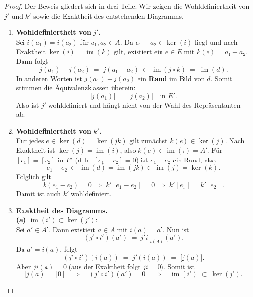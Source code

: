 \documentclass[12pt]{article}
\numberwithin{conj}{section}
\newcommand{\ima}{\operatorname{im}}
\begin{document}
    \begin{proof}
        Der Beweis gliedert sich in drei Teile. Wir zeigen die Wohldefiniertheit von
        $j'$ und $k'$ sowie die Exaktheit des entstehenden Diagramms.

        \begin{enumerate}[nolistsep]
            \item \textbf{Wohldefiniertheit von $j'$.} \\ Sei $i(a_{1}) = i(a_{2})$
                für $a_{1}, a_{2} \in A$. Da $a_{1} - a_{2} \in \ker(i)$ liegt und nach Exaktheit
                $\ker(i) = \ima(k)$ gilt, existiert ein $e \in E$ mit
                $k(e) = a_{1} - a_{2}$. Dann folgt
                \[
                    j(a_{1}) - j(a_{2}) \;=\; j(a_{1} - a_{2}) \;\in\; \ima(j \circ k) \;=\; \ima
                    (d).
                \]
                In anderen Worten ist $j(a_{1}) - j(a_{2})$ ein \textbf{Rand} im Bild
                von $d$. Somit stimmen die Äquivalenzklassen überein:
                \[
                    \bigl[j(a_{1})\bigr] \;=\; \bigl[j(a_{2})\bigr] \quad\text{in }E'.
                \]
                Also ist $j'$ wohldefiniert und hängt nicht von der Wahl des
                Repräsentanten ab.

            \item \textbf{Wohldefiniertheit von $k'$.} \\ Für jedes
                $e \in \ker(d) = \ker(jk)$ gilt zunächst $k(e) \in \ker(j)$. Nach Exaktheit
                ist $\ker(j) = \ima(i)$, also $k(e) \in \ima(i) = A'$. Für $[e_{1}] = [e_{2}
                ]$ in $E'$ (d.\,h.\ $[e_{1} - e_{2}] = 0$) ist $e_{1} - e_{2}$ ein Rand,
                also
                \[
                    e_{1} - e_{2} \;\in\; \ima(d) = \ima(jk) \subset \ima(j) = \ker(k).
                \]
                Folglich gilt
                \[
                    k(e_{1} - e_{2}) = 0 \;\Longrightarrow\; k' [e_{1} - e_{2}\,] = 0 \;\Longrightarrow\; k' [e_{1}\,]  = k' [e_{2}\,
                    ] .
                \]
                Damit ist auch $k'$ wohldefiniert.

            \item \textbf{Exaktheit des Diagramms.} \\ \textbf{(a)
                $\ima(i') \subset \ker(j')$}:\\ Sei $a' \in A'$. Dann existiert
                $a \in A$ mit $i(a) = a'$. Nun ist
                \[
                    (j' \circ i')(a') \;=\; j' i\vert_{i(A)}
                    (a') .
                \]
                Da $a' = i(a)$, folgt
                \[
                    (j' \circ i')(i(a)) \;=\; j'(i(a)) \;=\; \bigl[j(a)\bigr].
                \]
                Aber $ji(a) = 0$ (aus der Exaktheit folgt $ji =
                0$). Somit ist
                \[
                    \bigl[j(a)\bigr] = \bigl[0\,\bigr] \quad\Longrightarrow\quad (j' \circ
                    i')(a') = 0 \quad\Longrightarrow\quad \ima(i') \;\subset\; \ker(j').
                \]


\end{enumerate}
\end{proof}
\end{document}
